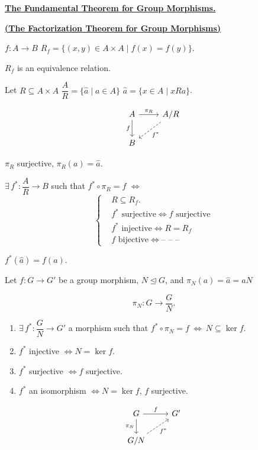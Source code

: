 \documentclass[12pt]{article}
\begin{document}
\noindent\underline{\textbf{The Fundamental Theorem for Group Morphisms.}}

\noindent\underline{\textbf{(The Factorization Theorem for Group Morphisms)}}

\bigskip
\noindent $f:A\to B$ \qquad $R_f = \{(x,y)\in A\times A \mid f(x)=f(y)\}$.

\noindent $R_f$ is an equivalence relation.

\bigskip
\noindent Let $R\subseteq A\times A$ \qquad $\dfrac{A}{R} = \{\hat a \mid a\in A\}$ \qquad $\hat a = \{x\in A \mid xRa\}$.

\[
\begin{tikzcd}
A \arrow[r,"\pi_R"] \arrow[d,"f"'] & A/R \arrow[dl, dashed,"f^*"] \\
B &
\end{tikzcd}
\]

\noindent $\pi_R$ surjective, \quad $\pi_R(a) = \hat a$.

\bigskip
\noindent $\exists\,f^*: \dfrac{A}{R} \to B$ such that $f^*\circ\pi_R = f$ $\Leftrightarrow$
\[
\left\{\begin{aligned}
&R\subseteq R_f.\\
&f^*\text{ surjective} \Leftrightarrow f \text{ surjective}\\
&f^*\text{ injective} \Leftrightarrow R=R_f\\
&f \text{ bijective} \Leftrightarrow \text{-- -- --}
\end{aligned}\right.
\]

\noindent $f^*(\hat a) = f(a)$.

\bigskip
\noindent Let $f:G\to G'$ be a group morphism, $N\trianglelefteq G$, and $\pi_N(a) = \hat a = aN$

\[
\pi_N: G \to \dfrac{G}{N}.
\]

\begin{enumerate}
\item[(1)] $\exists\,f^*: \dfrac{G}{N}\to G'$ a morphism such that $f^*\circ\pi_N = f \ \Leftrightarrow \ N\subseteq\ker f$.
\item[(2)] $f^*$ injective $\Leftrightarrow N=\ker f$.
\item[(3)] $f^*$ surjective $\Leftrightarrow f$ surjective.
\item[(4)] $f^*$ an isomorphism $\Leftrightarrow N=\ker f$, $f$ surjective.
\end{enumerate}

\[
\begin{tikzcd}
G \arrow[r,"f"] \arrow[d,"\pi_N"'] & G' \\
G/N \arrow[ur, dashed,"f^*"'] &
\end{tikzcd}
\]
\end{document}
